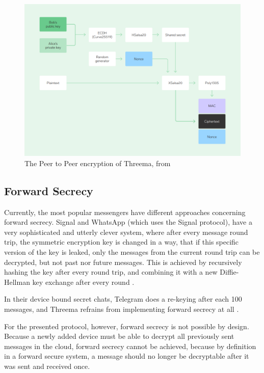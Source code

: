 \documentclass[a4paper, oneside]{discothesis}
\begin{document}
\begin{figure}[h!]
    \centering
    \includegraphics[width=\columnwidth]{figures/threema.png}
    \caption{The Peer to Peer encryption of Threema, from \cite{Threema}}
    \label{fig:peer_encryption}
\end{figure}

\subsection{Forward Secrecy}
\label{sec:forward_secrecy}

Currently, the most popular messengers have different approaches concerning forward secrecy. Signal and WhatsApp (which uses the Signal protocol), have a very sophisticated and utterly clever system, where after every message round trip, the symmetric encryption key is changed in a way, that if this specific version of the key is leaked, only the messages from the current round trip can be decrypted, but not past nor future messages. This is achieved by recursively hashing the key after every round trip, and combining it with a new Diffie-Hellman key exchange after every round \cite{DoubleRatchet}.

In their device bound secret chats, Telegram does a re-keying after each 100 messages, and Threema refrains from implementing forward secrecy at all \cite{Threema}.

For the presented protocol, however, forward secrecy is not possible by design. Because a newly added device must be able to decrypt all previously sent messages in the cloud, forward secrecy cannot be achieved, because by definition in a forward secure system, a message should no longer be decryptable after it was sent and received once.
\end{document}
